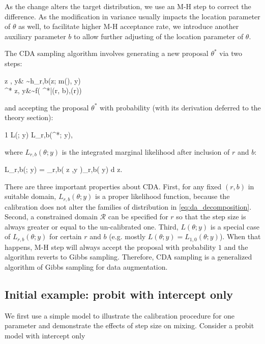 \documentclass[10pt]{article}
\newcommand{\be}{\begin{equs}}
\newcommand{\ee}{\end{equs}}
\newcommand{\mc}[1]{\mathcal{#1}}
\begin{document}
As the change alters the target distribution, we use an M-H step to correct the difference. As the modification in variance usually impacts the location parameter of $\theta$ as well, to facilitate higher M-H acceptance rate, we introduce another auxiliary parameter $b$ to allow further adjusting of the location parameter of $\theta$.

The CDA sampling algorithm involves generating a new proposal $\theta^*$ via two steps:
 
  \be
 z  \mid \theta, y& \sim h_{r,b}(z; m(\theta), y) \\
 \theta^*  \mid z, y&\sim f( \theta^*|\mu(r, b),\Sigma(r))
 \ee
 and accepting the proposal $ \theta^*$ with probability (with its derivation deferred to the theory section):
 \be
 1 \wedge  {} {L(\theta; y) L_{r,b}(\theta^*; y)},
 \ee
where $L_{r,b}(\theta ; y)$ is the integrated marginal likelihood after inclusion of $r$ and $b$:
 \be \label{eq:cda_decomposition}
 L_{r,b}(\theta ; y) = \int \pi_{r,b}\left( z \mid \theta,y \right)\pi_{r,b}( \theta \mid y) d z.
  \ee

There are three important properties about CDA. First, for any fixed $(r,b)$ in suitable domain, $L_{r,b}(\theta ; y)$ is a proper likelihood function, because the calibration does not alter the families of distribution in \eqref{eq:da_decomposition}. Second, a constrained domain $\mc R$  can be specified for $r$ so that the step size is always greater or equal to the un-calibrated one. Third,  $L(\theta;y)$ is a special case of  $L_{r,b}(\theta ; y)$ for certain $r$ and $b$ (e.g. mostly $L(\theta;y)=L_{1,0}(\theta;y)$). When that happens, M-H step will always accept the proposal with probability $1$ and the algorithm reverts to Gibbs sampling. Therefore, CDA sampling is a generalized algorithm of Gibbs sampling for data augmentation.



\subsection{Initial example: probit with intercept only}

We first use a simple model to illustrate the calibration procedure for one parameter and demonstrate the effects of step size on mixing. Consider a probit model with intercept only
\end{document}
